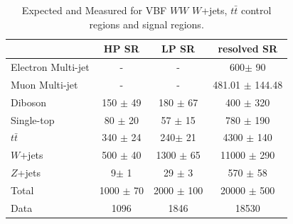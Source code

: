 \begin{table}
\begin{tabular}{|l|c|c|c|}
\hline
	  &	 HP SR &	 LP SR &	resolved SR \\\hline 
	Electron Multi-jet &	- &	- &	600$\pm$ 90 \\\hline 
	Muon Multi-jet &	- &	- &	481.01 $\pm$ 144.48 \\\hline 
	Diboson &	150 $\pm$ 49&	180 $\pm$ 67 &	400 $\pm$ 320 \\\hline 
	Single-top &	80 $\pm$ 20 &	57 $\pm$ 15 &	780 $\pm$ 190 \\\hline 
	$t\bar{t}$ &	340 $\pm$ 24 &	240$\pm$ 21 &	4300 $\pm$ 140 \\\hline 
	$W$+jets &	500 $\pm$ 40 &	1300 $\pm$ 65 &	11000 $\pm$ 290 \\\hline 
	$Z$+jets &	9$\pm$ 1 &	29 $\pm$ 3 &	570 $\pm$ 58 \\\hline 
	Total &	1000 $\pm$ 70 &	2000 $\pm$ 100 &	20000 $\pm$ 500 \\\hline 
	Data &	1096 &	1846 &	18530 \\\hline 
\end{tabular}
\caption{Expected and Measured for VBF $WW$ $W$+jets, $t\bar{t}$ control regions and signal regions.}
\label{tbl:hvtwvbf_yields_tcr}
\end{table}


